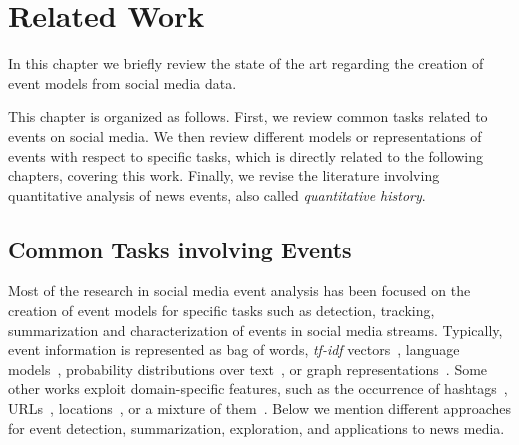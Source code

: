 \chapter{Related Work}


In this chapter we briefly review the state of the art regarding the creation of
event models from social media data.
%

This chapter is organized as follows. 
%
First, we review common tasks related to events on social media. 
%
We then review different models or representations of events with respect to
specific tasks, which is directly related to the following chapters, covering
this work. 
%
Finally, we revise the literature involving quantitative analysis of news
events, also called {\em quantitative history}.



\section{Common Tasks involving Events}

Most of the research in social media event analysis has been focused on the
creation of event models for specific tasks such as detection, tracking,
summarization and characterization of events in social media streams. 
%
Typically, event information is represented as bag of words, {\em tf-idf}
vectors~\cite{tfidf,Marcus:2011:TAV:1978942.1978975}, language
models~\cite{zellers2019neuralfakenews}, probability distributions over
text~\cite{o2010tweetmotif,Hong:2010:EST:1964858.1964870,zhao2011comparing,Mehrotra:2013:ILT:2484028.2484166},
or graph
representations~\cite{Setty:2018:ENE:3209978.3210136,Lee:2013:KSK:2487575.2487711,Lee:2014:CCS:2661829.2661859}.
%
Some other works exploit domain-specific features, such as the occurrence of
hashtags~\cite{Kamath:2013:SDO:2488388.2488447},
URLs~\cite{Alonso:2015:WCW:2740908.2745397},
locations~\cite{Abdelhaq:EvenTweet:2013}, or a mixture of
them~\cite{castillo2011information}.
%
Below we mention different approaches for event detection, summarization,
exploration, and applications to news media.
%


